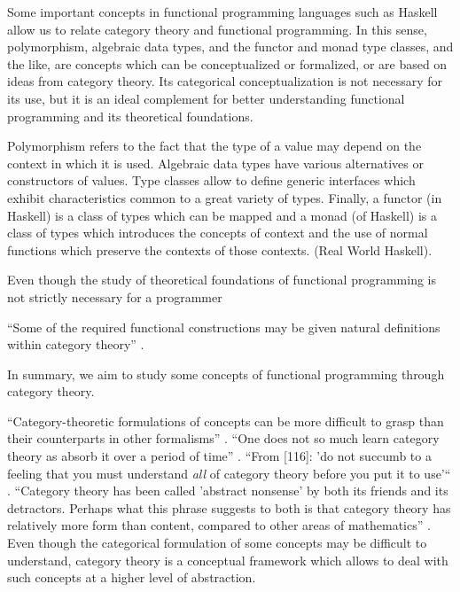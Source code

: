 Some important concepts in functional programming languages such as
Haskell allow us to relate category theory and functional programming.
In this sense, polymorphism, algebraic data types, and the functor and
monad type classes, and the like, are concepts which can be
conceptualized or formalized, or are based on ideas from category
theory. Its categorical conceptualization is not necessary for its
use, but it is an ideal complement for better understanding functional
programming and its theoretical foundations.

Polymorphism refers to the fact that the type of a value may depend on
the context in which it is used. Algebraic data types have various
alternatives or constructors of values. Type classes allow to define
generic interfaces which exhibit characteristics common to a great
variety of types. Finally, a functor (in Haskell) is a class of types
which can be mapped and a monad (of Haskell) is a class of types which
introduces the concepts of context and the use of normal functions
which preserve the contexts of those contexts. (Real World Haskell).


Even though the study of theoretical foundations of functional
programming is not strictly necessary for a programmer


``Some of the required functional constructions may be given natural
definitions within category theory'' \parencite[7]{pitt-1986}.



In summary, we aim to study some concepts of functional programming
through category theory.





``Category-theoretic formulations of concepts can be more difficult to
grasp than their counterparts in other formalisms''
\parencite[xi]{pierce-1991}. ``One does not so much learn category
theory as absorb it over a period of time''
\parencite[25]{bird-demoor-1997}. ``From [116]: 'do not succumb to a
feeling that you must understand \emph{all} of category theory before
you put it to use'`` \parencite[xi]{pierce-1991}. ``Category theory
has been called 'abstract nonsense' by both its friends and its
detractors. Perhaps what this phrase suggests to both is that category
theory has relatively more form than content, compared to other areas
of mathematics'' \parencite[50]{goguen-1991}. Even though the
categorical formulation of some concepts may be difficult to
understand, category theory is a conceptual framework which allows to
deal with such concepts at a higher level of abstraction.



